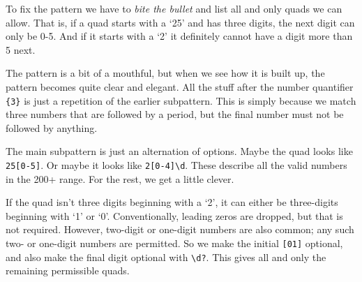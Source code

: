 To fix the pattern we have to \emph{bite the bullet} and list all and
only quads we can allow. That is, if a quad starts with a `25' and has
three digits, the next digit can only be 0-5. And if it starts with a
`2' it definitely cannot have a digit more than 5 next.

\begin{Shaded}
\begin{Highlighting}[]
\OperatorTok{=}\NormalTok{ (}
    \StringTok{\textquotesingle{}}
\NormalTok{)}
\end{Highlighting}
\end{Shaded}

The pattern is a bit of a mouthful, but when we see how it is built up,
the pattern becomes quite clear and elegant. All the stuff after the
number quantifier \texttt{\{3\}} is just a repetition of the earlier
subpattern. This is simply because we match three numbers that are
followed by a period, but the final number must not be followed by
anything.

The main subpattern is just an alternation of options. Maybe the quad
looks like \texttt{25{[}0-5{]}}. Or maybe it looks like
\texttt{2{[}0-4{]}\textbackslash{}d}. These describe all the valid
numbers in the 200+ range. For the rest, we get a little clever.

If the quad isn't three digits beginning with a `2', it can either be
three-digits beginning with `1' or `0'. Conventionally, leading zeros
are dropped, but that is not required. However, two-digit or one-digit
numbers are also common; any such two- or one-digit numbers are
permitted. So we make the initial \texttt{{[}01{]}} optional, and also
make the final digit optional with \texttt{\textbackslash{}d?}. This
gives all and only the remaining permissible quads.

